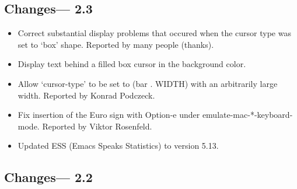 \subsection{Changes--- 2.3}
\begin{itemize}
\item Correct substantial display problems that occured when  the cursor type was set to `box' shape.
Reported by many people (thanks).
\item Display text behind a filled box cursor in the background color.
\item Allow `cursor-type' to be set to (bar . WIDTH) with an arbitrarily large width.
Reported by Konrad Podczeck.
\item Fix insertion of the Euro sign with Option-e under emulate-mac-*-keyboard-mode.
Reported by Viktor Rosenfeld.
\item Updated ESS (Emacs Speaks Statistics) to version 5.13.
\end{itemize}

\subsection{Changes--- 2.2}

